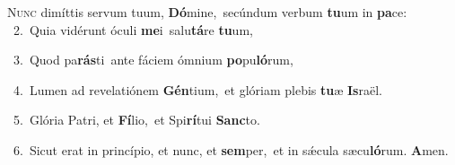 \lettrine{\initial\textcolor{\initialcolor}{N}}{unc} dimíttis servum tuum, \textbf{Dó}\-mine,~\star secúndum verbum \textbf{tu}\-um in \textbf{pa}\-ce:\\
{\numbfont\textcolor{\numbcolor}{~2.}}~Quia vidérunt óculi \textbf{me}\-i~\star salu\-\textbf{tá}\-re \textbf{tu}\-um,\par
{\numbfont\textcolor{\numbcolor}{~3.}}~Quod pa\-\textbf{rás}\-ti~\star ante fáciem ómnium \textbf{po}\-pu\-\textbf{ló}\-rum,\par
{\numbfont\textcolor{\numbcolor}{~4.}}~Lumen ad revelatiónem \textbf{Gén}\-tium,~\star et glóriam plebis \textbf{tu}\-æ \textbf{Is}\-raël.\par
{\numbfont\textcolor{\numbcolor}{~5.}}~Glória Patri, et \textbf{Fí}\-lio,~\star et Spi\-\textbf{rí}\-tui \textbf{Sanc}\-to.\par
{\numbfont\textcolor{\numbcolor}{~6.}}~Sicut erat in princípio, et nunc, et \textbf{sem}\-per,~\star et in sǽcula sæcu\-\textbf{ló}\-rum. \textbf{A}\-men.\par

